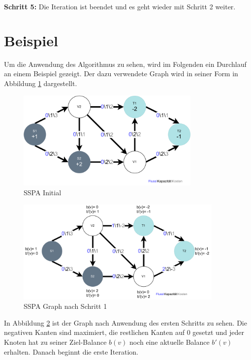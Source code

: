 \textbf{Schritt 5:} Die Iteration ist beendet und es geht wieder mit Schritt 2 weiter. 

\section{Beispiel}
Um die Anwendung des Algorithmus zu sehen, wird im Folgenden ein Durchlauf an einem Beispiel gezeigt. Der dazu verwendete Graph wird in seiner Form in Abbildung \ref{fig:sspa_initial} dargestellt.

\begin{figure}[H]
\centering
\includegraphics[width=0.8\textwidth]{img/anton/sspa-initial.pdf}
\caption{SSPA Initial}
\label{fig:sspa_initial}
\end{figure}

\begin{figure}[H]
\centering
\includegraphics[width=0.9\textwidth]{img/anton/sspa-Step1.pdf}
\caption{SSPA Graph nach Schritt 1}
\label{fig:sspa_step1}
\end{figure}

In Abbildung \ref{fig:sspa_step1} ist der Graph nach Anwendung des ersten Schritts zu sehen. Die negativen Kanten sind maximiert, die restlichen Kanten auf $0$ gesetzt und jeder Knoten hat zu seiner Ziel-Balance $b(v)$ noch eine aktuelle Balance $b'(v)$ erhalten. Danach beginnt die erste Iteration.

